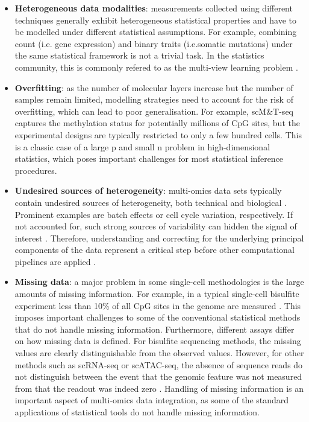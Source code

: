 \begin{itemize}
	\item \textbf{Heterogeneous data modalities}: measurements collected using different techniques generally exhibit heterogeneous statistical properties and have to be modelled under different statistical assumptions. For example, combining count (i.e. gene expression) and binary traits (i.e.somatic mutations) under the same statistical framework is not a trivial task. In the statistics community, this is commonly refered to as the multi-view learning problem \cite{Xu2013,Li2016}.

	\item \textbf{Overfitting}: as the number of molecular layers increase but the number of samples remain limited, modelling strategies need to account for the risk of overfitting, which can lead to poor generalisation. For example, scM\&T-seq captures the methylation status for potentially millions of CpG sites, but the experimental designs are typically restricted to only a few hundred cells. This is a classic case of a large p and small n problem in high-dimensional statistics, which poses important challenges for most statistical inference procedures.

	\item \textbf{Undesired sources of heterogeneity}: multi-omics data sets typically contain undesired sources of heterogeneity, both technical and biological \cite{Ritchie2015}. Prominent examples are batch effects or cell cycle variation, respectively. If not accounted for, such strong sources of variability can hidden the signal of interest \cite{Buettner2015}. Therefore, understanding and correcting for the underlying principal components of the data represent a critical step before other computational pipelines are applied \cite{Meng2016}.

	\item \textbf{Missing data}: a major problem in some single-cell methodologies is the large amounts of missing information. For example, in a typical single-cell bisulfite experiment less than 10\% of all CpG sites in the genome are measured \cite{Smallwood2014}. This imposes important challenges to some of the conventional statistical methods that do not handle missing information. Furthermore, different assays differ on how missing data is defined. For bisulfite sequencing methods, the missing values are clearly distinguishable from the observed values. However, for other methods such as scRNA-seq or scATAC-seq, the absence of sequence reads do not distinguish between the event that the genomic feature was not measured from that the readout was indeed zero \cite{Clark2018}. Handling of missing information is an important aspect of multi-omics data integration, as some of the standard applications of statistical tools do not handle missing information.


\end{itemize}
